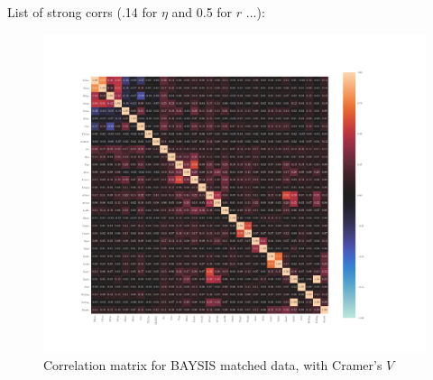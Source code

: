\documentclass[a4paper,headsepline,footsepline,fontsize=11pt,BCOR=12mm,DIV=12]{report}
\begin{document}
List of strong corrs (.14 for $\eta$ and 0.5 for $r$ ...):


\pagestyle{empty}
\begin{figure}[h]
	\centering
	\includegraphics[scale=0.52, trim=3cm 2cm 0cm 0cm]{../CorrAnalysis/data/BAYSIS/02_matched/plots/baysis_matched_corr_cramers}
	\caption{Correlation matrix for BAYSIS matched data, with Cramer's $V$}
	\label{img:appendix_correlation_matrix_matched_cramers}
\end{figure}
\restoregeometry
\pagestyle{headings}
\end{document}
